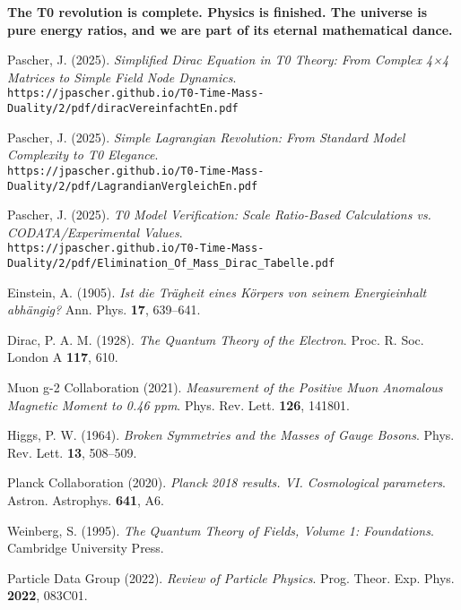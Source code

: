 \documentclass[12pt,a4paper]{article}
\theoremstyle{definition}
\theoremstyle{remark}
\begin{document}
															\textbf{The T0 revolution is complete. Physics is finished. The universe is pure energy ratios, and we are part of its eternal mathematical dance.}
															
															\begin{thebibliography}{99}
																Pascher, J. (2025). \textit{Simplified Dirac Equation in T0 Theory: From Complex 4×4 Matrices to Simple Field Node Dynamics}. \\
																\texttt{https://jpascher.github.io/T0-Time-Mass-Duality/2/pdf/diracVereinfachtEn.pdf}
																
																Pascher, J. (2025). \textit{Simple Lagrangian Revolution: From Standard Model Complexity to T0 Elegance}. \\
																\texttt{https://jpascher.github.io/T0-Time-Mass-Duality/2/pdf/LagrandianVergleichEn.pdf}
																
																Pascher, J. (2025). \textit{T0 Model Verification: Scale Ratio-Based Calculations vs. CODATA/Experimental Values}. \\
																\texttt{https://jpascher.github.io/T0-Time-Mass-Duality/2/pdf/Elimination\_Of\_Mass\_Dirac\_Tabelle.pdf}
																
																Einstein, A. (1905). \textit{Ist die Trägheit eines Körpers von seinem Energieinhalt abhängig?} Ann. Phys. \textbf{17}, 639--641.
																
																Dirac, P. A. M. (1928). \textit{The Quantum Theory of the Electron}. Proc. R. Soc. London A \textbf{117}, 610.
																
																Muon g-2 Collaboration (2021). \textit{Measurement of the Positive Muon Anomalous Magnetic Moment to 0.46 ppm}. Phys. Rev. Lett. \textbf{126}, 141801.
																
																Higgs, P. W. (1964). \textit{Broken Symmetries and the Masses of Gauge Bosons}. Phys. Rev. Lett. \textbf{13}, 508--509.
																
																Planck Collaboration (2020). \textit{Planck 2018 results. VI. Cosmological parameters}. Astron. Astrophys. \textbf{641}, A6.
																
																Weinberg, S. (1995). \textit{The Quantum Theory of Fields, Volume 1: Foundations}. Cambridge University Press.
																
																Particle Data Group (2022). \textit{Review of Particle Physics}. Prog. Theor. Exp. Phys. \textbf{2022}, 083C01.
															\end{thebibliography}
															
														
\end{document}

